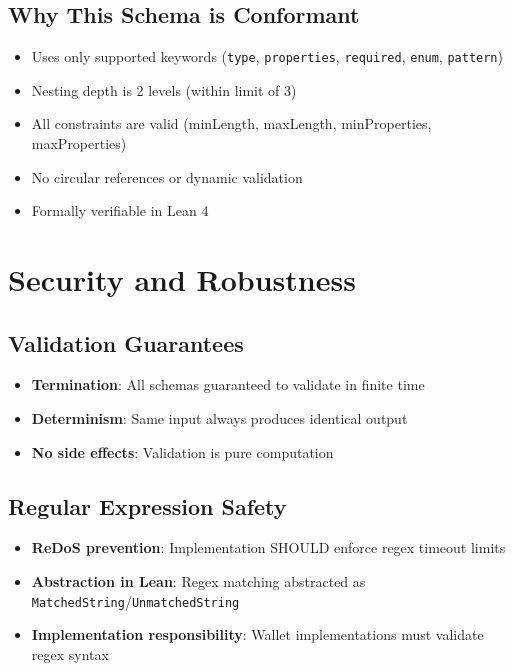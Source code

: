 \subsection{Why This Schema is Conformant}

\begin{itemize}
  \item Uses only supported keywords (\texttt{type}, \texttt{properties}, \texttt{required}, \texttt{enum}, \texttt{pattern})
  \item Nesting depth is 2 levels (within limit of 3)
  \item All constraints are valid (minLength, maxLength, minProperties, maxProperties)
  \item No circular references or dynamic validation
  \item Formally verifiable in Lean 4
\end{itemize}

\section{Security and Robustness}

\subsection{Validation Guarantees}

\begin{itemize}
  \item \textbf{Termination}: All schemas guaranteed to validate in finite time
  \item \textbf{Determinism}: Same input always produces identical output
  \item \textbf{No side effects}: Validation is pure computation
\end{itemize}

\subsection{Regular Expression Safety}

\begin{itemize}
  \item \textbf{ReDoS prevention}: Implementation SHOULD enforce regex timeout limits
  \item \textbf{Abstraction in Lean}: Regex matching abstracted as \texttt{MatchedString}/\texttt{UnmatchedString}
  \item \textbf{Implementation responsibility}: Wallet implementations must validate regex syntax
\end{itemize}

